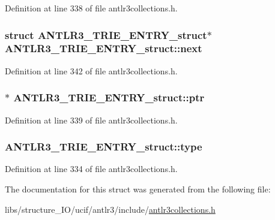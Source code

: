 Definition at line 338 of file antlr3collections.\-h.

\hypertarget{struct_a_n_t_l_r3___t_r_i_e___e_n_t_r_y__struct_a2d371b10b528dd022a8957676c7122f0}{
\subsubsection[{next}]{\setlength{\rightskip}{0pt plus 5cm}struct {\bf A\-N\-T\-L\-R3\-\_\-\-T\-R\-I\-E\-\_\-\-E\-N\-T\-R\-Y\-\_\-struct}$\ast$ A\-N\-T\-L\-R3\-\_\-\-T\-R\-I\-E\-\_\-\-E\-N\-T\-R\-Y\-\_\-struct\-::next}}\label{struct_a_n_t_l_r3___t_r_i_e___e_n_t_r_y__struct_a2d371b10b528dd022a8957676c7122f0}


Definition at line 342 of file antlr3collections.\-h.

\hypertarget{struct_a_n_t_l_r3___t_r_i_e___e_n_t_r_y__struct_a7b80d4de117215f5580878eaddffa314}{
\subsubsection[{ptr}]{$\ast$ A\-N\-T\-L\-R3\-\_\-\-T\-R\-I\-E\-\_\-\-E\-N\-T\-R\-Y\-\_\-struct\-::ptr}}\label{struct_a_n_t_l_r3___t_r_i_e___e_n_t_r_y__struct_a7b80d4de117215f5580878eaddffa314}


Definition at line 339 of file antlr3collections.\-h.

\hypertarget{struct_a_n_t_l_r3___t_r_i_e___e_n_t_r_y__struct_a85222cb343509b07c9b86f742e979ffe}{
\subsubsection[{type}]{ A\-N\-T\-L\-R3\-\_\-\-T\-R\-I\-E\-\_\-\-E\-N\-T\-R\-Y\-\_\-struct\-::type}}\label{struct_a_n_t_l_r3___t_r_i_e___e_n_t_r_y__struct_a85222cb343509b07c9b86f742e979ffe}


Definition at line 334 of file antlr3collections.\-h.



The documentation for this struct was generated from the following file\-:\begin{DoxyCompactItemize}
\item 
libs/structure\-\_\-\-I\-O/ucif/antlr3/include/\hyperlink{antlr3collections_8h}{antlr3collections.\-h}\end{DoxyCompactItemize}
